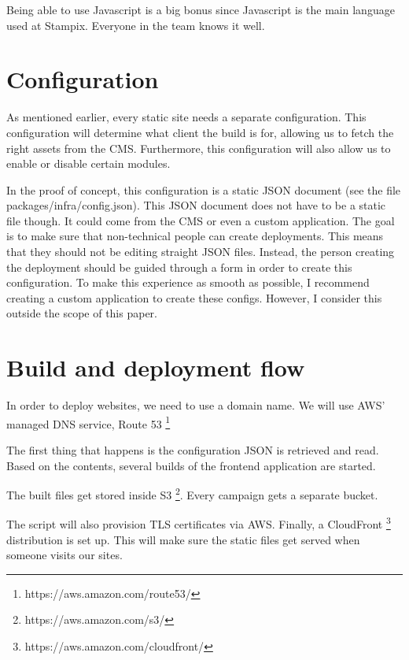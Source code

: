 Being able to use Javascript is a big bonus since Javascript is the main language used at Stampix. Everyone in the team knows it well.

\section{Configuration}

As mentioned earlier, every static site needs a separate configuration. 
This configuration will determine what client the build is for, allowing us to fetch the right assets from the CMS. 
Furthermore, this configuration will also allow us to enable or disable certain modules. 

In the proof of concept, this configuration is a static JSON document (see the file packages/infra/config.json). This JSON document does not have to be a static file though. 
It could come from the CMS or even a custom application. 
The goal is to make sure that non-technical people can create deployments. This means that they should not be editing straight JSON files.
Instead, the person creating the deployment should be guided through a form in order to create this configuration. 
To make this experience as smooth as possible, I recommend creating a custom application to create these configs. However, I consider this outside the scope of this paper.


\section{Build and deployment flow}

In order to deploy websites, we need to use a domain name. We will use AWS' managed DNS service, Route 53 \footnote{https://aws.amazon.com/route53/}

The first thing that happens is the configuration JSON is retrieved and read. Based on the contents, several builds of the frontend application are started.

The built files get stored inside S3 \footnote{https://aws.amazon.com/s3/}. Every campaign gets a separate bucket.

The script will also provision TLS certificates via AWS. 
Finally, a CloudFront \footnote{https://aws.amazon.com/cloudfront/} distribution is set up. This will make sure the static files get served when someone visits our sites.